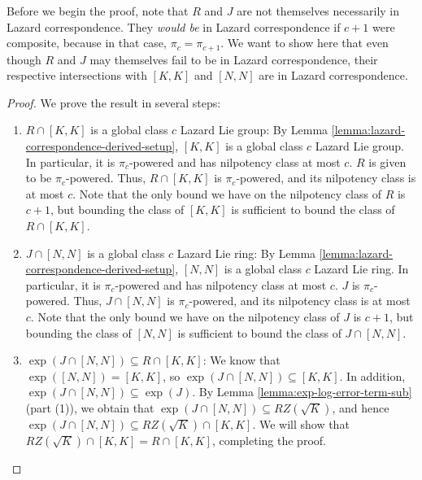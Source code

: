 \documentclass{ucetd}
\begin{document}
Before we begin the proof, note that $R$ and $J$ are not themselves
necessarily in Lazard correspondence. They {\em would be} in Lazard
correspondence if $c + 1$ were composite, because in that case, $\pi_c
= \pi_{c+1}$. We want to show here that even though $R$ and $J$ may
themselves fail to be in Lazard correspondence, their respective
intersections with $[K,K]$ and $[N,N]$ are in Lazard correspondence.

\begin{proof}
  We prove the result in several steps:

  \begin{enumerate}
  \item $R \cap [K,K]$ is a global class $c$ Lazard Lie group: By
    Lemma \ref{lemma:lazard-correspondence-derived-setup}, $[K,K]$ is
    a global class $c$ Lazard Lie group. In particular, it is
    $\pi_c$-powered and has nilpotency class at most $c$. $R$ is given
    to be $\pi_c$-powered. Thus, $R \cap [K,K]$ is $\pi_c$-powered,
    and its nilpotency class is at most $c$. Note that the only bound
    we have on the nilpotency class of $R$ is $c + 1$, but bounding the
    class of $[K,K]$ is sufficient to bound the class of $R \cap
    [K,K]$.
  \item $J \cap [N,N]$ is a global class $c$ Lazard Lie ring: By Lemma
    \ref{lemma:lazard-correspondence-derived-setup}, $[N,N]$ is a
    global class $c$ Lazard Lie ring. In particular, it is
    $\pi_c$-powered and has nilpotency class at most $c$. $J$ is
    $\pi_c$-powered. Thus, $J \cap [N,N]$ is $\pi_c$-powered, and its
    nilpotency class is at most $c$. Note that the only bound we have
    on the nilpotency class of $J$ is $c + 1$, but bounding the class
    of $[N,N]$ is sufficient to bound the class of $J \cap [N,N]$.
  \item $\exp(J \cap [N,N]) \subseteq R \cap [K,K]$: We know that
    $\exp([N,N]) = [K,K]$, so $\exp(J \cap [N,N]) \subseteq [K,K]$. In
    addition, $\exp(J \cap [N,N]) \subseteq \exp(J)$. By Lemma
    \ref{lemma:exp-log-error-term-sub} (part (1)), we obtain that
    $\exp(J \cap [N,N]) \subseteq RZ(\sqrt{K})$, and hence $\exp(J
    \cap [N,N]) \subseteq RZ(\sqrt{K}) \cap [K,K]$. We will show that
    $RZ(\sqrt{K}) \cap [K,K] = R \cap [K,K]$, completing the proof.


\end{enumerate}
\end{proof}
\end{document}
